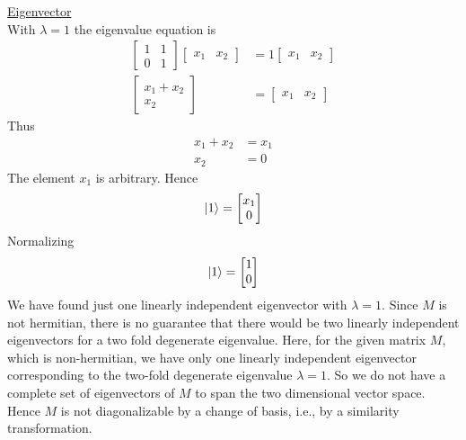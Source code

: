 \begin{enumerate}
		\underline{Eigenvector}\\
		With $\lambda=1$ the eigenvalue equation is
		\begin{eqnarray}
			\left[\begin{matrix}
				1 & 1 \\ 0 & 1
			\end{matrix}\right]
			\left[\begin{matrix}
				x_1 & x_2
			\end{matrix}\right]
			&= 1 \left[\begin{matrix}
			x_1 & x_2
			\end{matrix}\right] \nonumber\\
			\left[\begin{matrix}
				x_1+x_2 \\ x_2
			\end{matrix}\right]
			&= \left[\begin{matrix}
			x_1 & x_2
			\end{matrix}\right]
		\end{eqnarray}
		Thus
		\begin{eqnarray}
			x_1 + x_2 &= x_1 \nonumber \\
			x_2 &= 0 \nonumber
		\end{eqnarray}
		The element $x_1$ is arbitrary. Hence
		\begin{equation}
			\ket{1} = 
			\left[\begin{matrix}
				x_1 \\ 0
			\end{matrix}\right]
		\end{equation}
		Normalizing
		\begin{equation}
		\ket{1} = 
		\left[\begin{matrix}
		1 \\ 0
		\end{matrix}\right]
		\end{equation}
		We have found just one linearly independent eigenvector with $\lambda=1$. Since $M$ is not hermitian, there is no guarantee that there would be two linearly independent eigenvectors for a two fold degenerate eigenvalue. Here, for the given matrix $M$, which is non-hermitian, we have only one linearly independent eigenvector corresponding to the two-fold degenerate eigenvalue $\lambda=1$. So we do not have a complete set of eigenvectors of $M$ to span the two dimensional vector space. Hence $M$ is not diagonalizable by a change of basis, i.e., by a similarity transformation.
		
		


\end{enumerate}
